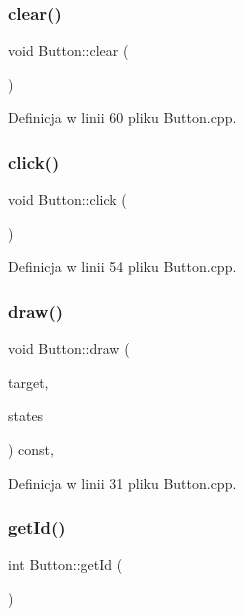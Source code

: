 \subsubsection{\texorpdfstring{clear()}{clear()}}
{\footnotesize\ttfamily void Button\+::clear (\begin{DoxyParamCaption}{ }\end{DoxyParamCaption})}



Definicja w linii 60 pliku Button.\+cpp.

\mbox{\label{class_button_a2fc33ec22217562b28ac6f02bda26c6e}} 
\subsubsection{\texorpdfstring{click()}{click()}}
{\footnotesize\ttfamily void Button\+::click (\begin{DoxyParamCaption}{ }\end{DoxyParamCaption})}



Definicja w linii 54 pliku Button.\+cpp.

\mbox{\label{class_button_a94b2be0ad227968afccae8bc297ed99a}} 
\subsubsection{\texorpdfstring{draw()}{draw()}}
{\footnotesize\ttfamily void Button\+::draw (\begin{DoxyParamCaption}\item[{sf\+::\+Render\+Target \&}]{target,  }\item[{sf\+::\+Render\+States}]{states }\end{DoxyParamCaption}) const\hspace{0.3cm}{\ttfamily [override]}, {\ttfamily [protected]}}



Definicja w linii 31 pliku Button.\+cpp.

\mbox{\label{class_button_a0b024eb643308f2cfa8d13cd93c6b1ca}} 
\subsubsection{\texorpdfstring{get\+Id()}{getId()}}
{\footnotesize\ttfamily int Button\+::get\+Id (\begin{DoxyParamCaption}{ }\end{DoxyParamCaption})}



